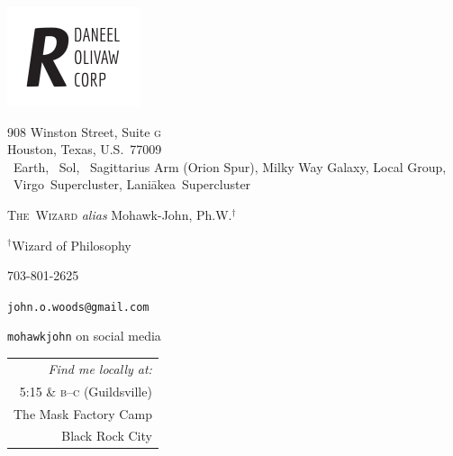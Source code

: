 \documentclass[10pt,twoside,openany]{article}
\begin{document}
\hspace{-1.6em}
\begin{minipage}{0.44\textwidth}
\includegraphics[scale=1.5]{r_daneel_olivaw.pdf}
\end{minipage}\hfill
\begin{minipage}{0.5\textwidth}
\vspace{0.2em}
908 Winston Street, Suite \textsc{g} \\
Houston, Texas, U.S.\ 77009 \\
\small \Earth\ Earth, \Sun\ Sol, \footnotesize \Sagittarius\ Sagittarius Arm (Orion Spur), \scriptsize Milky Way Galaxy, Local Group, \tiny \Virgo\ Virgo~Supercluster, Lani\={a}kea~Supercluster
\end{minipage}
\vspace{-0.8em}
\par\textsc{\Large The~Wizard} \textit{alias} Mohawk-John, Ph.W.${}^\dagger$

\begin{minipage}{0.51\textwidth}
\par {\scriptsize${}^\dagger$Wizard of Philosophy}
\vspace{0.5em}
\par \small 703-801-2625
\par \small \texttt{john.o.woods@gmail.com}
\par \small\texttt{mohawkjohn} on social media
\\
\end{minipage}\hfill
\begin{minipage}{0.43\textwidth}\footnotesize
\begin{tabularx}{0.54\textwidth}{r}
\textit{Find me locally at:} \\
5:15 \& \textsc{b--c} (Guildsville)\\
The Mask Factory Camp \\
Black Rock City
\end{tabularx}
\end{minipage}
\end{document}
